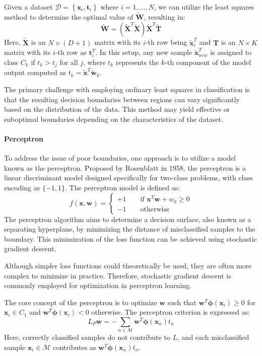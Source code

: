 Given a dataset $\mathcal{D}=\left\{ \textbf{x}_i, \textbf{t}_i  \right\}$ where $i=1,\dots,N$, we can utilize the least squares method to determine the optimal value of $\tilde{\textbf{W}}$, resulting in:
\[\tilde{\textbf{W}}=\left(\tilde{\textbf{X}}^T\tilde{\textbf{X}}\right)\tilde{\textbf{X}}^T\tilde{\textbf{T}}\]
Here, $\tilde{\textbf{X}}$ is an $N \times (D+1)$ matrix with its $i$-th row being $\tilde{\textbf{x}}_i^T$ and $\textbf{T}$ is an $N \times K$ matrix with its $i$-th row as $\textbf{t}_i^T$.
In this setup, any new sample $\tilde{\textbf{x}}^T_{new}$ is assigned to class $C_k$ if $t_k>t_j$ for all $j$, where $t_k$ represents the $k$-th component of the model output computed as $t_k=\tilde{\textbf{x}}^T\tilde{\textbf{w}}_k$. 

The primary challenge with employing ordinary least squares in classification is that the resulting decision boundaries between regions can vary significantly based on the distribution of the data. 
This method may yield effective or suboptimal boundaries depending on the characteristics of the dataset.

\paragraph*{Perceptron}
To address the issue of poor boundaries, one approach is to utilize a model known as the perceptron. 
Proposed by Rosenblatt in 1958, the perceptron is a linear discriminant model designed specifically for two-class problems, with class encoding as $\{-1,1\}$. 
The perceptron model is defined as:
\[f(\textbf{x},\textbf{w})=\begin{cases}
    +1 \qquad \text{if } \textbf{x}^T\textbf{w}+w_0 \geq 0 \\
    -1 \qquad \text{otherwise}
\end{cases}\]
The perceptron algorithm aims to determine a decision surface, also known as a separating hyperplane, by minimizing the distance of misclassified samples to the boundary. 
This minimization of the loss function can be achieved using stochastic gradient descent.

Although simpler loss functions could theoretically be used, they are often more complex to minimize in practice. 
Therefore, stochastic gradient descent is commonly employed for optimization in perceptron learning.

The core concept of the perceptron is to optimize $\textbf{w}$ such that $\textbf{w}^T\boldsymbol{\phi}(\textbf{x}_i) \geq 0$ for $\textbf{x}_i \in C_1$ and $\textbf{w}^T\boldsymbol{\phi}(\textbf{x}_i) < 0$ otherwise. 
The perceptron criterion is expressed as:
\[L_P{\textbf{w}}=-\sum_{n \in \mathcal{M}}\textbf{w}^T\boldsymbol{\phi}(\textbf{x}_n)t_n\]
Here, correctly classified samples do not contribute to $L$, and each misclassified sample $\textbf{x}_i \in \mathcal{M}$ contributes as $\textbf{w}^T\boldsymbol{\phi}(\textbf{x}_n)t_n$. 

